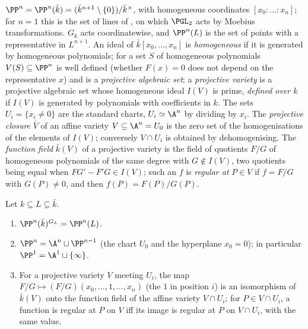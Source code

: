 \begin{definition}\label{def:curves:projective-space}
$\PP^n=\PP^n(\bar k)=(\bar k^{n+1}\setminus\{0\})/\bar k^\times$, with homogeneous coordinates $[x_0:\dots:x_n]$; for $n=1$ this is the set of lines of
, on which $\PGL_2$ acts by Moebius transformations. $G_k$ acts coordinatewise, and $\PP^n(L)$ is the set of points with a
representative in $L^{n+1}$. An ideal of $\bar k[x_0,\dots,x_n]$ is \emph{homogeneous} if it is generated by homogeneous polynomials; for a set $S$ of
homogeneous polynomials $V(S)\subseteq\PP^n$ is well defined (whether $F(x)=0$ does not depend on the representative $x$) and is a \emph{projective
algebraic set}; a \emph{projective variety} is a projective algebraic set whose homogeneous ideal $I(V)$ is prime, \emph{defined over $k$} if
$I(V)$ is generated by polynomials with coefficients in $k$. The sets $U_i=\{x_i\ne0\}$ are the standard charts, $U_i\simeq\A^n$ by dividing by
$x_i$. The \emph{projective closure} $\bar V$ of an affine variety $V\subseteq\A^n=U_0$ is the zero set of the homogenisations of the elements of
$I(V)$; conversely $V\cap U_i$ is obtained by dehomogenising. The \emph{function field} $\bar k(V)$ of a projective variety is the field of
quotients $F/G$ of homogeneous polynomials of the same degree with $G\notin I(V)$, two quotients being equal when $FG'-F'G\in I(V)$; such an $f$ is
\emph{regular at} $P\in V$ if $f=F/G$ with $G(P)\ne0$, and then $f(P)=F(P)/G(P)$.
\end{definition}

\begin{proposition}\label{prop:curves:projective-points}
Let $k\subseteq L\subseteq\bar k$.
\begin{enumerate}[label=(\roman*)]
\item $\PP^n(\bar k)^{G_L}=\PP^n(L)$.
\item $\PP^n=\A^n\sqcup\PP^{n-1}$ (the chart $U_0$ and the hyperplane $x_0=0$); in particular $\PP^1=\A^1\sqcup\{\infty\}$.
\item For a projective variety $V$ meeting $U_i$, the map $F/G\mapsto(F/G)(x_0,\dots,1,\dots,x_n)$ (the $1$ in position $i$) is an isomorphism of $\bar k(V)$
onto the function field of the affine variety $V\cap U_i$; for $P\in V\cap U_i$, a function is regular at $P$ on $V$ iff its image is regular at $P$ on
$V\cap U_i$, with the same value.
\end{enumerate}
\end{proposition}

